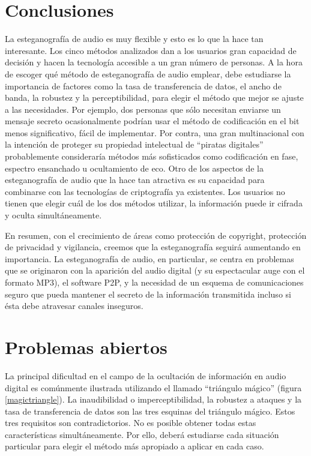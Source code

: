 \documentclass[12pt]{article}
\begin{document}
\newpage
\section{Conclusiones}

La esteganografía de audio es muy flexible y esto es lo que la hace tan interesante. Los cinco métodos analizados dan a los usuarios gran capacidad de decisión y hacen la tecnología accesible a un gran número de personas. A la hora de escoger qué método de esteganografía de audio emplear, debe estudiarse la importancia de factores como la tasa de transferencia de datos, el ancho de banda, la robustez y la perceptibilidad, para elegir el método que mejor se ajuste a las necesidades. Por ejemplo, dos personas que sólo necesitan enviarse un mensaje secreto ocasionalmente podrían usar el método de codificación en el bit menos significativo, fácil de implementar. Por contra, una gran multinacional con la intención de proteger su propiedad intelectual de ``piratas digitales'' probablemente consideraría métodos más sofisticados como codificación en fase, espectro ensanchado u ocultamiento de eco. Otro de los aspectos de la esteganografía de audio que la hace tan atractiva es su capacidad para combinarse con las tecnologías de criptografía ya existentes. Los usuarios no tienen que elegir cuál de los dos métodos utilizar, la información puede ir cifrada y oculta simultáneamente.

En resumen, con el crecimiento de áreas como protección de copyright, protección de privacidad y vigilancia, creemos que la esteganografía seguirá aumentando en importancia. La esteganografía de audio, en particular, se centra en problemas que se originaron con la aparición del audio digital (y su espectacular auge con el formato MP3), el software P2P, y la necesidad de un esquema de comunicaciones seguro que pueda mantener el secreto de la información transmitida incluso si ésta debe atravesar canales inseguros.

\newpage
\section{Problemas abiertos}

La principal dificultad en el campo de la ocultación de información en audio digital es comúnmente ilustrada utilizando el llamado ``triángulo mágico'' (figura \ref{magictriangle}). La inaudibilidad o imperceptibilidad, la robustez a ataques y la tasa de transferencia de datos son las tres esquinas del triángulo mágico. Estos tres requisitos son contradictorios. No es posible obtener todas estas características simultáneamente. Por ello, deberá estudiarse cada situación particular para elegir el método más apropiado a aplicar en cada caso.
\end{document}
